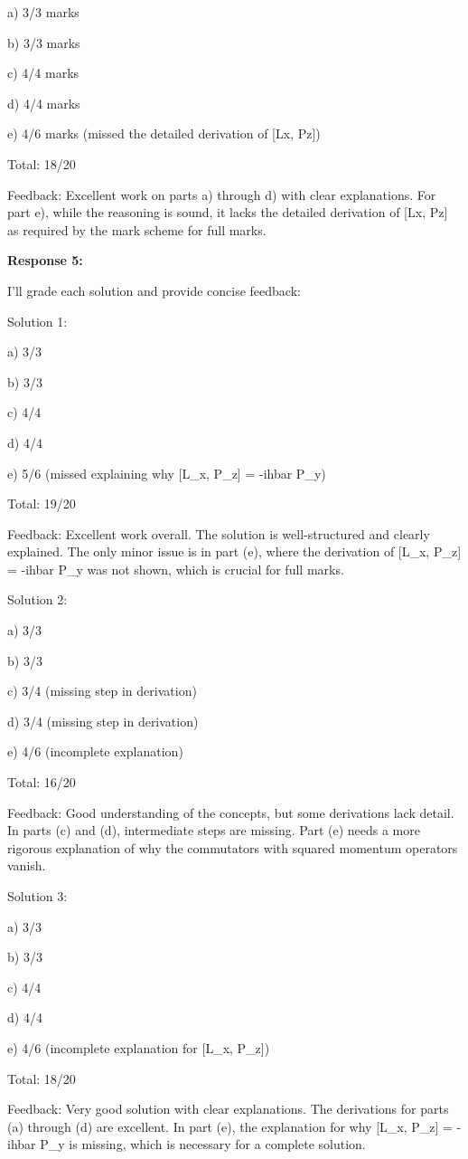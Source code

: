\documentclass[a4paper,11pt]{article}
\begin{document}
a) 3/3 marks

b) 3/3 marks

c) 4/4 marks

d) 4/4 marks

e) 4/6 marks (missed the detailed derivation of [Lx, Pz])

Total: 18/20

Feedback: Excellent work on parts a) through d) with clear explanations. For part e), while the reasoning is sound, it lacks the detailed derivation of [Lx, Pz] as required by the mark scheme for full marks.

\bigskip
\textbf{Response 5:}

I'll grade each solution and provide concise feedback:

Solution 1:

a) 3/3

b) 3/3

c) 4/4

d) 4/4

e) 5/6 (missed explaining why [L_x, P_z] = -ihbar P_y)

Total: 19/20

Feedback: Excellent work overall. The solution is well-structured and clearly explained. The only minor issue is in part (e), where the derivation of [L_x, P_z] = -ihbar P_y was not shown, which is crucial for full marks.

Solution 2:

a) 3/3

b) 3/3

c) 3/4 (missing step in derivation)

d) 3/4 (missing step in derivation)

e) 4/6 (incomplete explanation)

Total: 16/20

Feedback: Good understanding of the concepts, but some derivations lack detail. In parts (c) and (d), intermediate steps are missing. Part (e) needs a more rigorous explanation of why the commutators with squared momentum operators vanish.

Solution 3:

a) 3/3

b) 3/3

c) 4/4

d) 4/4

e) 4/6 (incomplete explanation for [L_x, P_z])

Total: 18/20

Feedback: Very good solution with clear explanations. The derivations for parts (a) through (d) are excellent. In part (e), the explanation for why [L_x, P_z] = -ihbar P_y is missing, which is necessary for a complete solution.
\end{document}
